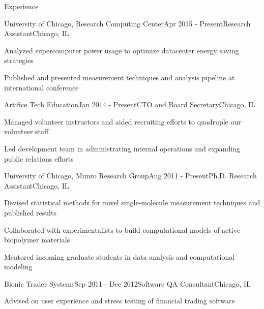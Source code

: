 \documentclass{resume} %
\begin{document}
\begin{rSection}{Experience}

\begin{rSubsection}{University of Chicago, Research Computing Center}{Apr 2015 - Present}{Research Assistant}{Chicago, IL}
\item Analyzed supercomputer power usage to optimize datacenter energy saving strategies
\item Published and presented measurement techniques and analysis pipeline at international conference

\end{rSubsection}


\begin{rSubsection}{Artifice Tech Education}{Jan 2014 - Present}{CTO and Board Secretary}{Chicago, IL}
	\item Managed volunteer instructors and aided recruiting efforts to quadruple our volunteer staff
	\item Led development team in administrating internal operations and expanding public relations efforts
	
\end{rSubsection}


\begin{rSubsection}{University of Chicago, Munro Research Group}{Aug 2011 - Present}{Ph.D. Research Assistant}{Chicago, IL}
\item Devised statistical methods for novel single-molecule measurement techniques and published results
\item Collaborated with experimentalists to build computational models of active biopolymer materials
\item Mentored incoming graduate students in data analysis and computational modeling

\end{rSubsection}


\begin{rSubsection}{Bionic Trader Systems}{Sep 2011 - Dec 2012}{Software QA Consultant}{Chicago, IL}
\item Advised on user experience and stress testing of financial trading software

\end{rSubsection}


\end{rSection}
\end{document}

